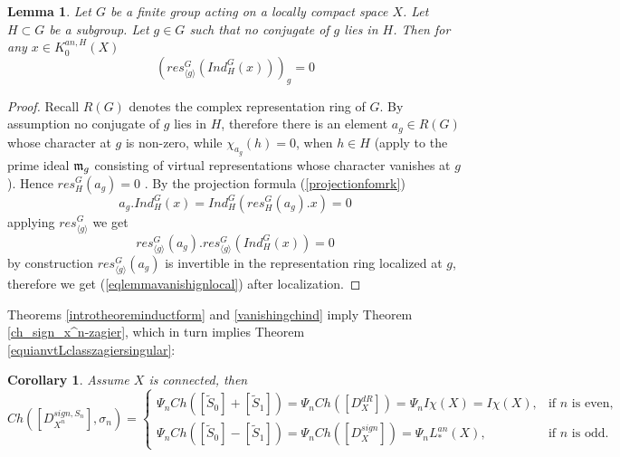 \documentclass[11pt,leqno,twoside]{amsart}
\theoremstyle{plainsl}
\newtheorem{lemma}[theorem]{Lemma}
\newtheorem{corollary}[theorem]{Corollary}
\theoremstyle{definition}
\begin{document}
\begin{lemma}\label{mackylem} Let $G$ be a finite group acting on a locally compact space $X$.
    Let $H\subset G$ be a subgroup. Let $g\in G$ such that no conjugate of $g$ lies in $H$. Then for any $x\in K_0^{an,H}(X)$
    \begin{equation}\label{eqlemmavanishignlocal}
        \left( res^G_{\langle g\rangle}(Ind^G_H(x)) \right)_g=0
    \end{equation}
\end{lemma}
\begin{proof}
Recall $R(G)$ denotes the complex representation ring of $G$. By assumption no conjugate of $g$ lies in $H$, therefore there is an element $a_g\in R(G)$ whose character at $g$ is non-zero, while  $\chi_{a_g}(h) =0$, when $h\in H$ (apply \cite[Prop.~3.7(iv)]{Se} to the prime ideal $\frak{m}_g$ consisting of virtual representations whose character vanishes at $g$). Hence $res^G_H(a_g)=0$  . By the projection formula (\ref{projectionfomrk})
\[a_g.Ind^G_H(x)=Ind^G_H(res^G_H(a_g).x)=0\]
applying $res^G_{\langle g\rangle}$ we get
\[res^G_{\langle g\rangle}(a_g).res^G_{\langle g\rangle}(Ind^G_H(x))=0\]
by construction $res^G_{\langle g\rangle}(a_g)$ is invertible in the representation ring localized at $g$, therefore we get (\ref{eqlemmavanishignlocal}) after localization.
\end{proof}
























Theorems \ref{introtheoreminductform} and \ref{vanishingchind} imply Theorem \ref{ch_sign_x^n-zagier}, which in turn implies Theorem \ref{equianvtLclasszagiersingular}:


\begin{corollary}\label{ch_sgiamr_x^r}
Assume \(X\) is connected, then
\[
Ch(\left[D^{sign,S_n}_{X^n}\right],\sigma_n)
=
\begin{cases}
\Psi_nCh([\tilde{S}_{0}]+[\tilde{S}_{1}])
=\Psi_nCh([D^{dR}_X])=\Psi_nI\chi(X)=I\chi(X), & \text{if } n \text{ is even},\\[4pt]
\Psi_nCh([\tilde{S}_{0}]-[\tilde{S}_{1}])
=\Psi_nCh([D^{sign}_X])=\Psi_nL^{an}_*(X), & \text{if } n \text{ is odd}.
\end{cases}
\]
\end{corollary}
\end{document}

